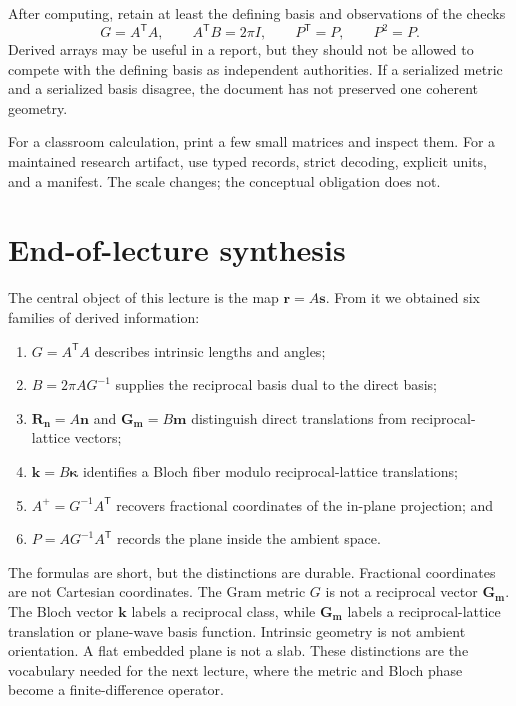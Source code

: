 After computing, retain at least the defining basis and observations of the
checks
\begin{equation}
  G=A^{\mathsf T}A,
  \qquad
  A^{\mathsf T}B=2\pi I,
  \qquad
  P^{\mathsf T}=P,
  \qquad
  P^2=P.
  \label{eq:training-geometry-lab-checks}
\end{equation}
Derived arrays may be useful in a report, but they should not be allowed to
compete with the defining basis as independent authorities. If a serialized
metric and a serialized basis disagree, the document has not preserved one
coherent geometry.

For a classroom calculation, print a few small matrices and inspect them. For a
maintained research artifact, use typed records, strict decoding, explicit
units, and a manifest. The scale changes; the conceptual obligation does not.

\section{End-of-lecture synthesis}

The central object of this lecture is the map $\mathbf r=A\mathbf s$. From it we
obtained six families of derived information:

\begin{enumerate}
  \item $G=A^{\mathsf T}A$ describes intrinsic lengths and angles;
  \item $B=2\pi AG^{-1}$ supplies the reciprocal basis dual to the direct basis;
  \item $\mathbf R_{\mathbf n}=A\mathbf n$ and
        $\mathbf G_{\mathbf m}=B\mathbf m$ distinguish direct translations from
        reciprocal-lattice vectors;
  \item $\mathbf k=B\boldsymbol\kappa$ identifies a Bloch fiber modulo
        reciprocal-lattice translations;
  \item $A^+=G^{-1}A^{\mathsf T}$ recovers fractional coordinates of the
        in-plane projection; and
  \item $P=AG^{-1}A^{\mathsf T}$ records the plane inside the ambient space.
\end{enumerate}

The formulas are short, but the distinctions are durable. Fractional
coordinates are not Cartesian coordinates. The Gram metric $G$ is not a
reciprocal vector $\mathbf G_{\mathbf m}$. The Bloch vector $\mathbf k$ labels
a reciprocal class, while $\mathbf G_{\mathbf m}$ labels a reciprocal-lattice
translation or plane-wave basis function. Intrinsic geometry is not ambient
orientation. A flat embedded plane is not a slab. These distinctions are the
vocabulary needed for the next lecture, where the metric and Bloch phase become
a finite-difference operator.

